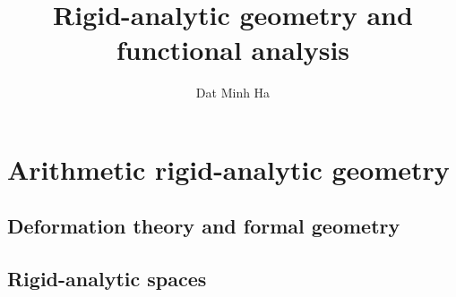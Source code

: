 

\setcounter{chapter}{-1}




    \title{Rigid-analytic geometry and functional analysis}
    
    \author{Dat Minh Ha}
    \maketitle
    
    \begin{abstract}
        
    \end{abstract}
    
    {
      \hypersetup{} 
      \dominitoc
      \tableofcontents %
    }
    
    

    \part{Arithmetic rigid-analytic geometry}
        \chapter{Deformation theory and formal geometry}
            \begin{abstract}
                
            \end{abstract}
            
            \minitoc
        
            
            
            
            
            
            
            
            
            
            
            
        
        \chapter{Rigid-analytic spaces}
            \begin{abstract}
                
            \end{abstract}
            
